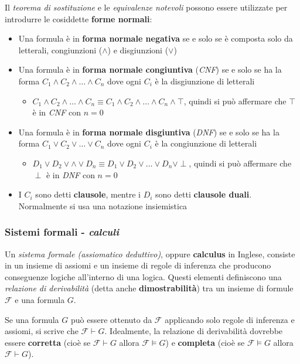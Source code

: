 \documentclass[italian, 10pt]{article}
\begin{document}
Il \textit{teorema di sostituzione} e le \textit{equivalenze notevoli} possono essere utilizzate per introdurre le cosiddette \textbf{forme normali}:

\begin{itemize}
  \item Una formula è in \textbf{forma normale negativa} se e solo se è composta solo da letterali, congiunzioni (\(\land\)) e disgiunzioni (\(\lor\))
  \item Una formula è in \textbf{forma normale congiuntiva} (\textit{CNF}) se e solo se ha la forma \(C_1 \land C_2 \land \ldots \land C_n\) dove ogni \(C_i\) è la disgiunzione di letterali
        \begin{itemize}[label=\(\rightarrow\)]
          \item \(C_1 \land C_2 \land \ldots \land C_n \equiv C_1 \land C_2 \land \ldots \land C_n \land \top\), quindi si può affermare che \(\top\) è in \textit{CNF} con \(n = 0\)
        \end{itemize}
  \item Una formula è in \textbf{forma normale disgiuntiva} (\textit{DNF}) se e solo se ha la forma \(C_1 \lor C_2 \lor \ldots \lor C_n\) dove ogni \(C_i\) è la congiunzione di letterali
        \begin{itemize}[label=\(\rightarrow\)]
          \item \(D_1 \lor D_2 \lor \land \lor D_n \equiv D_1 \lor D_2 \lor \ldots \lor D_n \lor \perp\), quindi si può affermare che \(\perp\) è in \textit{DNF} con \(n = 0\)
        \end{itemize}
  \item I \(C_i\) sono detti \textbf{clausole}, mentre i \(D_i\) sono detti \textbf{clausole duali}. Normalmente si usa una notazione insiemistica
\end{itemize}

\subsubsection{Sistemi formali - \textit{calculi}}

Un \textit{sistema formale (assiomatico deduttivo)}, oppure \textbf{calculus} in Inglese, consiste in un insieme di assiomi e un insieme di regole di inferenza che producono conseguenze logiche all'interno di una logica.
Questi elementi definiscono una \textit{relazione di derivabilità} (detta anche \textbf{dimostrabilità}) tra un insieme di formule \(\mathcal{F}\) e una formula \(G\).

Se una formula \(G\) può essere ottenuto da \(\mathcal{F}\) applicando solo regole di inferenza e assiomi, si scrive che \(\mathcal{F} \vdash G\).
Idealmente, la relazione di derivabilità dovrebbe essere \textbf{corretta} (cioè se \(\mathcal{F} \vdash G\) allora \(\mathcal{F} \vDash G\)) e \textbf{completa} (cioè se \(\mathcal{F} \vDash G\) allora \(\mathcal{F} \vdash G\)).
\end{document}
